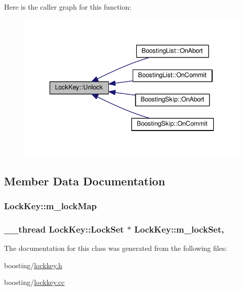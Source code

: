 Here is the caller graph for this function\-:
\nopagebreak
\begin{figure}[H]
\begin{center}
\leavevmode
\includegraphics[width=336pt]{classLockKey_acb4b0e1caa6571dae666f3bcbb367df0_icgraph}
\end{center}
\end{figure}




\subsection{Member Data Documentation}
\hypertarget{classLockKey_ab2c69fd900b76bbe73d61113fd72a649}{
\subsubsection[{m\-\_\-lock\-Map}]{ Lock\-Key\-::m\-\_\-lock\-Map\hspace{0.3cm}{\ttfamily [private]}}}\label{classLockKey_ab2c69fd900b76bbe73d61113fd72a649}
\hypertarget{classLockKey_a0ab7ba3859ccae1c1e8b20c3203fe6ba}{
\subsubsection[{m\-\_\-lock\-Set}]{\setlength{\rightskip}{0pt plus 5cm}\-\_\-\-\_\-thread {\bf Lock\-Key\-::\-Lock\-Set} $\ast$ Lock\-Key\-::m\-\_\-lock\-Set\hspace{0.3cm}{\ttfamily [static]}, {\ttfamily [private]}}}\label{classLockKey_a0ab7ba3859ccae1c1e8b20c3203fe6ba}


The documentation for this class was generated from the following files\-:\begin{DoxyCompactItemize}
\item 
boosting/\hyperlink{lockkey_8h}{lockkey.\-h}\item 
boosting/\hyperlink{lockkey_8cc}{lockkey.\-cc}\end{DoxyCompactItemize}
